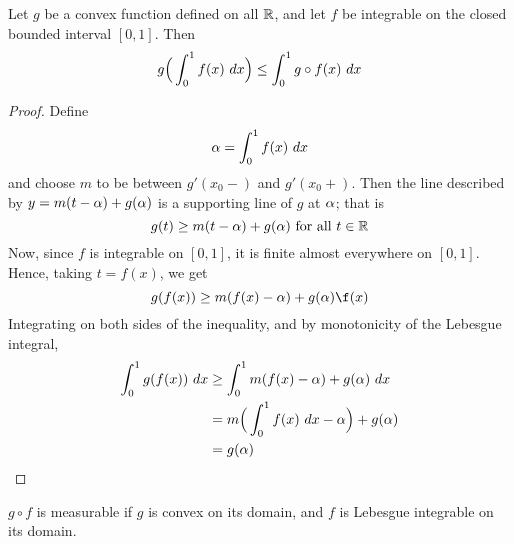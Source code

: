 \begin{theorem}\label{11.5.6}
    Let $g$ be a convex function defined on all $\mathbb{R}$, and let $f$ be integrable
    on the closed bounded interval $[0,1]$. Then
    \begin{equation*}
        g\Big{(} \int_0^1{f(x) \ dx} \Big{)} \leq \int_0^1{g \circ f(x) \ dx}
    \end{equation*}
\end{theorem}
\begin{proof}
    Define
    \begin{equation*}
        \alpha=\int_0^1{f(x) \ dx}
    \end{equation*}
    and choose $m$ to be between  $g'(x_0-)$ and $g'(x_0+)$. Then the line
    described by $y=m(t-\alpha)+g(\alpha)$ is a supporting line of $g$ at $\alpha$; that is
    \begin{equation*}
        g(t) \geq m(t-\alpha)+g(\alpha) \text{ for all } t \in \mathbb{R}
    \end{equation*}
    Now, since $f$ is integrable on $[0,1]$, it is finite almost everywhere on
    $[0,1]$. Hence, taking $t=f(x)$, we get
    \begin{equation*}
        g(f(x)) \geq m(f(x)-\a)+g(\a) \f(x)
    \end{equation*}
    Integrating on both sides of the inequality, and by monotonicity of the
    Lebesgue integral,
    \begin{align*}
        \int_0^1{g(f(x)) \ dx}  &\geq   \int_0^1{m(f(x)-\a)+g(\a) \ dx} \\
                             &= m\Big{(} \int_0^1{f(x) \ dx}-\a \Big{)}+g(\a)  \\
                             &= g(\a)   \\
    \end{align*}
\end{proof}
\begin{corollary}
    $g \circ f$ is measurable if  $g$ is convex on its domain, and  $f$ is
    Lebesgue integrable on its domain.
\end{corollary}
